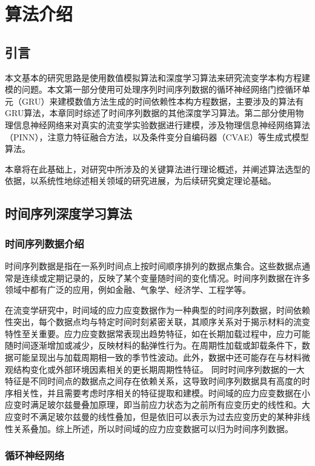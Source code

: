 \chapter{算法介绍}
\section{引言}
本文基本的研究思路是使用数值模拟算法和深度学习算法来研究流变学本构方程建模的问题。本文第一部分使用可处理序列时间序列数据的循环神经网络门控循环单元（GRU）来建模数值方法生成的时间依赖性本构方程数据，主要涉及的算法有GRU算法，本章同时综述了时间序列数据的其他深度学习算法。第二部分使用物理信息神经网络来对真实的流变学实验数据进行建模，涉及物理信息神经网络算法（PINN），注意力特征融合方法，以及条件变分自编码器（CVAE）等生成式模型算法。

本章将在此基础上，对研究中所涉及的关键算法进行理论概述，并阐述算法选型的依据，以系统性地综述相关领域的研究进展，为后续研究奠定理论基础。
\section{时间序列深度学习算法}
\subsection{时间序列数据介绍}
时间序列数据是指在一系列时间点上按时间顺序排列的数据点集合。这些数据点通常是连续或定期记录的，反映了某个变量随时间的变化情况。时间序列数据在许多领域中都有广泛的应用，例如金融、气象学、经济学、工程学等。

在流变学研究中，时间域的应力应变数据作为一种典型的时间序列数据，时间依赖性突出，每个数据点均与特定时间时刻紧密关联，其顺序关系对于揭示材料的流变特性至关重要。应力应变数据常表现出趋势特征，如在长期加载过程中，应力可能随时间逐渐增加或减少，反映材料的黏弹性行为。在周期性加载或卸载条件下，数据可能呈现出与加载周期相一致的季节性波动。此外，数据中还可能存在与材料微观结构变化或外部环境因素相关的更长期周期性特征\cite{ewoldtDesigningComplexFluids2022}。
同时时间序列数据的一大特征是不同时间点的数据点之间存在依赖关系，这导致时间序列数据具有高度的时序相关性，并且需要考虑时序相关的特征提取和建模。时间域的应力应变数据在小应变时满足玻尔兹曼叠加原理，即当前应力状态为之前所有应变历史的线性和\cite{boltzmannZurTheorieElastischen1878}。大应变时不满足玻尔兹曼的线性叠加，但是依旧可以表示为过去应变历史的某种非线性关系叠加。综上所述，所以时间域的应力应变数据可以归为时间序列数据。
\subsection{循环神经网络}
